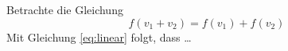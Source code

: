 Betrachte die Gleichung
    \begin{equation}
        \label{eq:linear}
        f(v_1 + v_2) = f(v_1) + f(v_2)
    \end{equation}
Mit Gleichung \eqref{eq:linear} folgt, dass \dots
